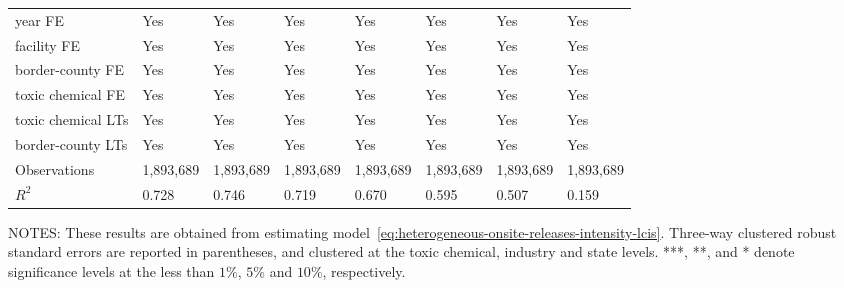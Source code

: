 \begin{table}[H]
{\begin{tabular}{@{}llllllll@{}}
            year FE                               & Yes       & Yes           & Yes       & Yes          & Yes             & Yes           & Yes                 \\
            facility FE                           & Yes       & Yes           & Yes       & Yes          & Yes             & Yes           & Yes                 \\
            border-county FE                      & Yes       & Yes           & Yes       & Yes          & Yes             & Yes           & Yes                 \\
            toxic chemical FE                     & Yes       & Yes           & Yes       & Yes          & Yes             & Yes           & Yes                 \\
            toxic chemical LTs                    & Yes       & Yes           & Yes       & Yes          & Yes             & Yes           & Yes                 \\
            border-county LTs                     & Yes       & Yes           & Yes       & Yes          & Yes             & Yes           & Yes                 \\\midrule
            Observations                          & 1,893,689 & 1,893,689     & 1,893,689 & 1,893,689    & 1,893,689       & 1,893,689     & 1,893,689           \\
            $R^2$                                 & 0.728     & 0.746         & 0.719     & 0.670        & 0.595           & 0.507         & 0.159               \\ \bottomrule\bottomrule
        \end{tabular}%
    }
    \begin{minipage}{\columnwidth}
        \vspace{0.05in}
        \tiny NOTES: These results are obtained from estimating model~\ref{eq:heterogeneous-onsite-releases-intensity-lcis}. Three-way clustered robust standard errors are reported in parentheses, and clustered at the toxic chemical, industry and state levels. ***, **, and * denote significance levels at the less than $1\%$, $5\%$ and $10\%$, respectively.
    \end{minipage}
\end{table}